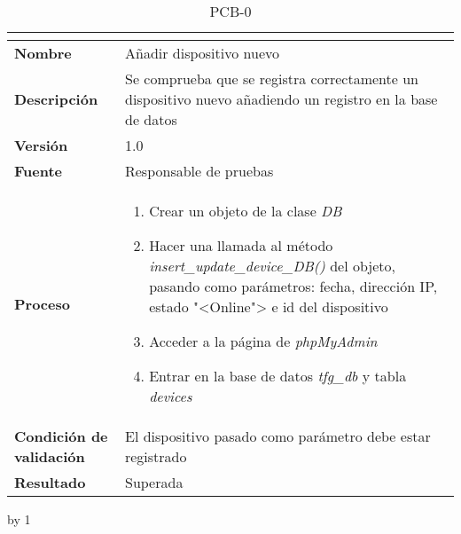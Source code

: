\begin{table}[H]
	\caption{PCB-0\number\pcb}
	\begin{tabular}{|l|p{}|}
		\hline
		\multicolumn{2}{|c|}{\cellcolor[HTML]{BFBFBF}{\color[HTML]{000000} \textbf{PCB-0\number\pcb}}} \\ \hline
		\textbf{Nombre}                  & Añadir dispositivo nuevo                                                                                  \\ \hline
		\textbf{Descripción}             & Se comprueba que se registra correctamente un dispositivo nuevo añadiendo un registro en la base de datos \\ \hline
		\textbf{Versión}                 & 1.0                                                                                                       \\ \hline
		\textbf{Fuente}                  & Responsable de pruebas                                                                                    \\ \hline
		\textbf{Proceso}                 & \begin{enumerate}
			\item Crear un objeto de la clase \textit{DB}
			\item Hacer una llamada al método \textit{insert\_update\_device\_DB()} del objeto, pasando como parámetros: fecha, dirección IP, estado "<Online"> e id del dispositivo
			\item Acceder a la página de \textit{phpMyAdmin}
			\item Entrar en la base de datos \textit{tfg\_db} y tabla \textit{devices}
		\end{enumerate}                                                                                 \\ \hline
		\textbf{Condición de validación} & El dispositivo pasado como parámetro debe estar registrado                                                \\ \hline
		\textbf{Resultado}               & Superada                                                                                                  \\ \hline
	\end{tabular}
\end{table}
\advance\pcb by 1
